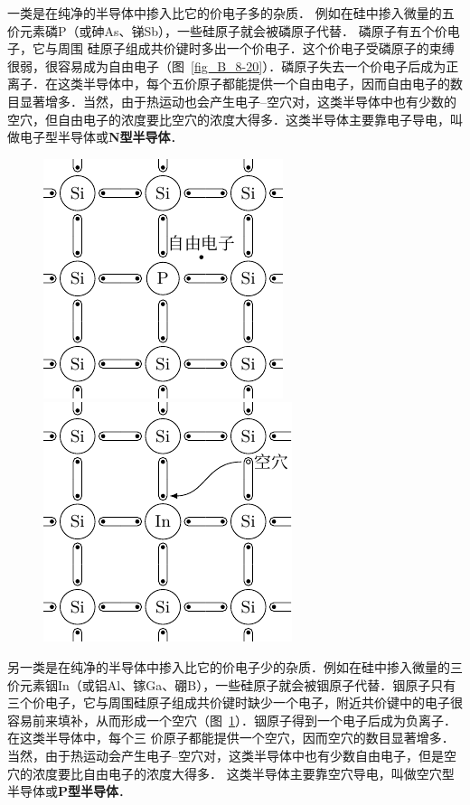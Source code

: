 一类是在纯净的半导体中掺入比它的价电子多的杂质．
例如在硅中掺入微量的五价元素磷P（或砷As、锑Sb），一些硅原子就会被磷原子代替．
磷原子有五个价电子，它与周围
硅原子组成共价键时多出一个价电子．这个价电子受磷原子的束缚很弱，很容易成为自由电子（图~\ref{fig_B_8-20}）．磷原子失去一个价电子后成为正离子．在这类半导体中，每个五价原子都能提供一个自由电子，因而自由电子的数目显著增多．当然，由于热运动也会产生电子--空穴对，这类半导体中也有少数的空穴，但自由电子的浓度要比空穴的浓度大得多．这类半导体主要靠电子导电，叫做电子型半导体或\textbf{N型半导体}．
\begin{figure}[htbp]
    \centering
    \begin{minipage}[t]{0.48\textwidth}
        \centering
        \includegraphics{fig/B/8-20.pdf}
        \caption{}\label{fig_B_8-20}
    \end{minipage}
    \begin{minipage}[t]{0.48\textwidth}
        \centering
        \includegraphics{fig/B/8-21.pdf}
        \caption{}\label{fig_B_8-21}
    \end{minipage}
\end{figure}

另一类是在纯净的半导体中掺入比它的价电子少的杂质．例如在硅中掺入微量的三价元素铟In（或铝Al、镓Ga、硼B），一些硅原子就会被铟原子代替．铟原子只有三个价电子，它与周围硅原子组成共价键时缺少一个电子，附近共价键中的电子很容易前来填补，从而形成一个空穴（图~\ref{fig_B_8-21}）．铟原子得到一个电子后成为负离子．在这类半导体中，每个三
价原子都能提供一个空穴，因而空穴的数目显著增多．当然，由于热运动会产生电子--空穴对，这类半导体中也有少数自由电子，但是空穴的浓度要比自由电子的浓度大得多．
这类半导体主要靠空穴导电，叫做空穴型半导体或\textbf{P型半导体}．

